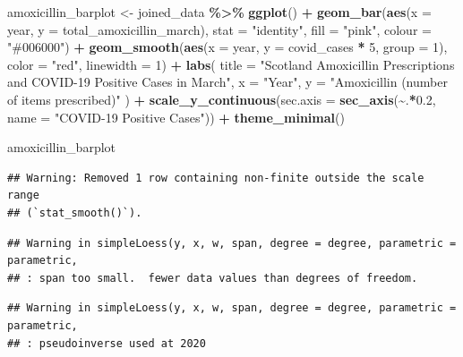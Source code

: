 \documentclass[
]{article}
\newenvironment{Shaded}{\begin{snugshade}}{\end{snugshade}}
\newcommand{\AttributeTok}[1]{\textcolor[rgb]{0.13,0.29,0.53}{#1}}
\newcommand{\DecValTok}[1]{\textcolor[rgb]{0.00,0.00,0.81}{#1}}
\newcommand{\FloatTok}[1]{\textcolor[rgb]{0.00,0.00,0.81}{#1}}
\newcommand{\FunctionTok}[1]{\textcolor[rgb]{0.13,0.29,0.53}{\textbf{#1}}}
\newcommand{\NormalTok}[1]{#1}
\newcommand{\OtherTok}[1]{\textcolor[rgb]{0.56,0.35,0.01}{#1}}
\newcommand{\SpecialCharTok}[1]{\textcolor[rgb]{0.81,0.36,0.00}{\textbf{#1}}}
\newcommand{\StringTok}[1]{\textcolor[rgb]{0.31,0.60,0.02}{#1}}
\begin{document}
\begin{Shaded}
\begin{Highlighting}[]
\NormalTok{amoxicillin\_barplot }\OtherTok{\textless{}{-}}\NormalTok{ joined\_data }\SpecialCharTok{\%\textgreater{}\%}
  \FunctionTok{ggplot}\NormalTok{() }\SpecialCharTok{+}
  \FunctionTok{geom\_bar}\NormalTok{(}\FunctionTok{aes}\NormalTok{(}\AttributeTok{x =}\NormalTok{ year, }\AttributeTok{y =}\NormalTok{ total\_amoxicillin\_march), }\AttributeTok{stat =} \StringTok{"identity"}\NormalTok{, }\AttributeTok{fill =} \StringTok{"pink"}\NormalTok{, }\AttributeTok{colour =} \StringTok{"\#006000"}\NormalTok{) }\SpecialCharTok{+}
  \FunctionTok{geom\_smooth}\NormalTok{(}\FunctionTok{aes}\NormalTok{(}\AttributeTok{x =}\NormalTok{ year, }\AttributeTok{y =}\NormalTok{ covid\_cases }\SpecialCharTok{*} \DecValTok{5}\NormalTok{, }\AttributeTok{group =} \DecValTok{1}\NormalTok{), }\AttributeTok{color =} \StringTok{"red"}\NormalTok{, }\AttributeTok{linewidth =} \DecValTok{1}\NormalTok{) }\SpecialCharTok{+}
  \FunctionTok{labs}\NormalTok{(}
    \AttributeTok{title =} \StringTok{"Scotland Amoxicillin Prescriptions and COVID{-}19 Positive Cases in March"}\NormalTok{,}
    \AttributeTok{x =} \StringTok{"Year"}\NormalTok{, }\AttributeTok{y =} \StringTok{"Amoxicillin (number of items prescribed)"}
\NormalTok{  ) }\SpecialCharTok{+}
  \FunctionTok{scale\_y\_continuous}\NormalTok{(}\AttributeTok{sec.axis =} \FunctionTok{sec\_axis}\NormalTok{(}\SpecialCharTok{\textasciitilde{}}\NormalTok{.}\SpecialCharTok{*}\FloatTok{0.2}\NormalTok{, }\AttributeTok{name =} \StringTok{"COVID{-}19 Positive Cases"}\NormalTok{)) }\SpecialCharTok{+}
  \FunctionTok{theme\_minimal}\NormalTok{()}

\NormalTok{amoxicillin\_barplot}
\end{Highlighting}
\end{Shaded}

\begin{verbatim}
## Warning: Removed 1 row containing non-finite outside the scale range
## (`stat_smooth()`).
\end{verbatim}

\begin{verbatim}
## Warning in simpleLoess(y, x, w, span, degree = degree, parametric = parametric,
## : span too small.  fewer data values than degrees of freedom.
\end{verbatim}

\begin{verbatim}
## Warning in simpleLoess(y, x, w, span, degree = degree, parametric = parametric,
## : pseudoinverse used at 2020
\end{verbatim}
\end{document}
